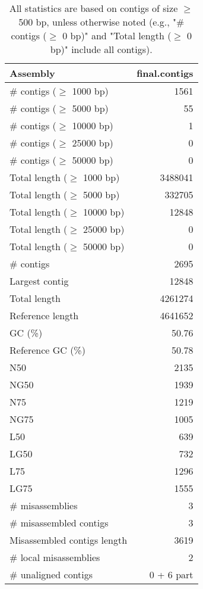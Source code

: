 \documentclass[12pt,a4paper]{article}
\begin{document}
\begin{table}[ht]
\begin{center}
\caption{All statistics are based on contigs of size $\geq$ 500 bp, unless otherwise noted (e.g., "\# contigs ($\geq$ 0 bp)" and "Total length ($\geq$ 0 bp)" include all contigs).}
\begin{tabular}{|l*{1}{|r}|}
\hline
Assembly & final.contigs \\ \hline
\# contigs ($\geq$ 1000 bp) & 1561 \\ \hline
\# contigs ($\geq$ 5000 bp) & 55 \\ \hline
\# contigs ($\geq$ 10000 bp) & 1 \\ \hline
\# contigs ($\geq$ 25000 bp) & 0 \\ \hline
\# contigs ($\geq$ 50000 bp) & 0 \\ \hline
Total length ($\geq$ 1000 bp) & 3488041 \\ \hline
Total length ($\geq$ 5000 bp) & 332705 \\ \hline
Total length ($\geq$ 10000 bp) & 12848 \\ \hline
Total length ($\geq$ 25000 bp) & 0 \\ \hline
Total length ($\geq$ 50000 bp) & 0 \\ \hline
\# contigs & 2695 \\ \hline
Largest contig & 12848 \\ \hline
Total length & 4261274 \\ \hline
Reference length & 4641652 \\ \hline
GC (\%) & 50.76 \\ \hline
Reference GC (\%) & 50.78 \\ \hline
N50 & 2135 \\ \hline
NG50 & 1939 \\ \hline
N75 & 1219 \\ \hline
NG75 & 1005 \\ \hline
L50 & 639 \\ \hline
LG50 & 732 \\ \hline
L75 & 1296 \\ \hline
LG75 & 1555 \\ \hline
\# misassemblies & 3 \\ \hline
\# misassembled contigs & 3 \\ \hline
Misassembled contigs length & 3619 \\ \hline
\# local misassemblies & 2 \\ \hline
\# unaligned contigs & 0 + 6 part \\ \hline

\end{tabular}
\end{center}
\end{table}
\end{document}
